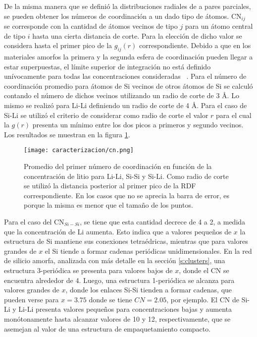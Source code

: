 De la misma manera que se definió la distribuciones radiales de a pares parciales,
se pueden obtener los números de coordinación a un dado tipo de átomos. CN$_{ij}$
se corresponde con la cantidad de átomos vecinos de tipo $j$ para un átomo central 
de tipo $i$ hasta una cierta distancia de corte. Para la elección de dicho valor 
se considera hasta el primer pico de la $g_{ij}(r)$ correspondiente. Debido a que 
en los materiales amorfos la primera y la segunda esfera de coordinación pueden 
llegar a estar superpuestas, el límite superior de integración no está definido 
unívocamente para todas las concentraciones consideradas ~\cite{lamparter1995}.
Para el número de coordinación promedio para átomos de Si vecinos de otros átomos 
de Si se calculó contando el número de dichos vecinos utilizando un radio de 
corte de 3 \AA. Lo mismo se realizó para Li-Li definiendo un radio de corte de 
4 \AA. Para el caso de Si-Li se utilizó el criterio de considerar como radio de 
corte el valor $r$ para el cual la $g(r)$ presenta un mínimo entre los dos picos
a primeros y segundo vecinos. Los resultados se muestran en la figura 
\ref{fig:cn1}.
\begin{figure}[th]
    \centering
    \texttt{[image: caracterizacion/cn.png]}
    \caption{Promedio del primer número de coordinación en función de la 
    concentración de litio para Li-Li, Si-Si y Si-Li. Como radio de corte se 
    utilizó la distancia posterior al primer pico de la RDF correspondiente. En 
    los casos que no se aprecia la barra de error, es porque la misma es menor 
    que el tamaño de los puntos.}
    \label{fig:cn1}
\end{figure}

Para el caso del CN$_{Si-Si}$, se tiene que esta cantidad decrece de 4 a 2, a 
medida que la concentración de Li aumenta. Esto indica que a valores pequeños de 
$x$ la estructura de Si mantiene sus conexiones tetraédricas, mientras que para
valores grandes de $x$ el Si tiende a formar cadenas periódicas unidimensionales.
En la red de silicio amorfa, analizada con más detalle en la sección 
\ref{s:clusters}, una estructura 3-periódica se presenta para valores bajos de 
$x$, donde el CN se encuentra alrededor de 4. Luego, una estructura 1-periódica se
alcanza para valores grandes de $x$, donde los enlaces Si-Si tienden a formar 
cadenas, que pueden verse para $x = 3.75$ donde se tiene $CN = 2.05$, por ejemplo.
El CN de Si-Li y Li-Li presenta valores pequeños para concentraciones 
bajas y aumenta monótonamente hasta alcanzar valores de 10 y 12, respectivamente, 
que se asemejan al valor de una estructura de empaquetamiento compacto.

